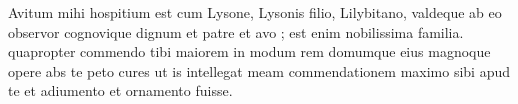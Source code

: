 


 Avitum mihi hospitium est cum Lysone, Lysonis filio, Lilybitano, valdeque ab eo observor cognovique dignum et patre et avo ; est enim nobilissima familia. quapropter commendo tibi maiorem in modum rem domumque eius magnoque opere abs te peto cures ut is intellegat meam commendationem maximo sibi apud te et adiumento et ornamento fuisse.
